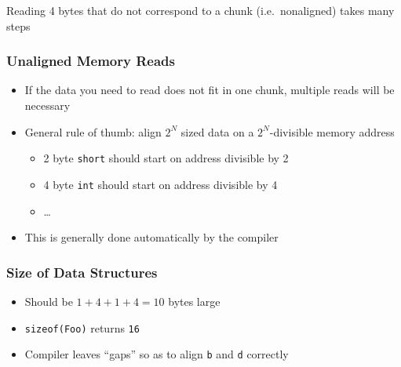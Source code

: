 \begin{frame}
\begin{center}
  \end{center}
  \begin{center}
    Reading 4 bytes that do not correspond to a chunk (i.e.~nonaligned) takes many steps
  \end{center}
\end{frame}

\begin{frame}
  \frametitle{Unaligned Memory Reads}
  \begin{itemize}
    \item If the data you need to read does not fit in one chunk, multiple reads will be necessary
    \item General rule of thumb: align $2^N$ sized data on a $2^N$-divisible memory address
          \begin{itemize}
            \item 2 byte \texttt{short} should start on address divisible by 2
            \item 4 byte \texttt{int} should start on address divisible by 4
            \item \dots
          \end{itemize}
    \item This is generally done automatically by the compiler
  \end{itemize}
\end{frame}

\begin{frame}
  \frametitle{Size of Data Structures}
  \begin{itemize}
    \item Should be $1+4+1+4 = 10$ bytes large
    \item \texttt{sizeof(Foo)} returns \texttt{16}
    \item Compiler leaves ``gaps'' so as to align \texttt{b} and \texttt{d} correctly
  \end{itemize}
\end{frame}

